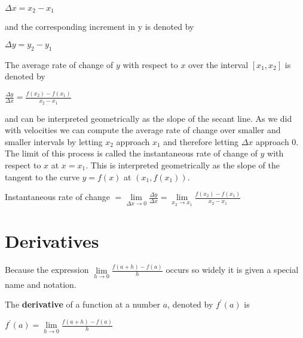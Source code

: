 \begin{center}
$ \Delta x =x_{2} -x_{1}$
\end{center}\par
and the corresponding increment in y is denoted by 


\begin{center}
$ \Delta y =y_{2} -y_{1}$
\end{center}\par
The average rate of change of $y$ with respect to $x$ over the interval $\left [x_{1} ,x_{2}\right ]$ is denoted by 


\begin{center}
$\frac{ \Delta y}{ \Delta x} =\frac{f (x_{2}) -f (x_{1})}{x_{2} -x_{1}}$
\end{center}\par
and can be interpreted geometrically as the slope of the secant line. As
we did with velocities we can compute the average rate of change over smaller and smaller intervals by letting $x_{2}$ approach $x_{1}$ and therefore letting $ \Delta x$ approach $0$. The limit of this process is called the instantaneous rate of change of $y$ with respect to $x$ at $x =x_{1}$. This is interpreted geometrically as the slope of the tangent to
the curve $y =f (x)$ at $(x_{1} ,f (x_{1}))$. 


\begin{center}
Instantaneous rate of change $ =\underset{ \Delta x \rightarrow 0}{\lim }\frac{ \Delta y}{ \Delta x} =\underset{x_{2} \rightarrow x_{1}}{\lim }\frac{f (x_{2}) -f (x_{1})}{x_{2} -x_{1}}$
\end{center}\par


\section{Derivatives}
Because the expression $\underset{h \rightarrow 0}{\lim }\frac{f (a +h) -f (a)}{h}$ occurs so widely it is given a special name and notation. 

The \textbf{derivative} of a function at a number
$a$, denoted by $f^{ \prime } (a)$ is 


\begin{center}
$f^{ \prime } (a) =\underset{h \rightarrow 0}{\lim }\frac{f (a +h) -f (a)}{h}$
\end{center}\par


